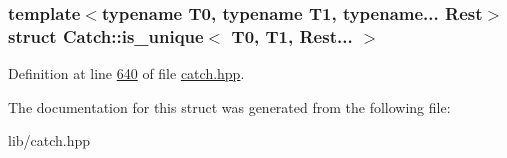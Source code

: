 \subsubsection*{template$<$typename T0, typename T1, typename... Rest$>$\newline
struct Catch\+::is\+\_\+unique$<$ T0, T1, Rest... $>$}



Definition at line \mbox{\hyperlink{catch_8hpp_source_l00640}{640}} of file \mbox{\hyperlink{catch_8hpp_source}{catch.\+hpp}}.



The documentation for this struct was generated from the following file\+:\begin{DoxyCompactItemize}
\item 
lib/catch.\+hpp\end{DoxyCompactItemize}
